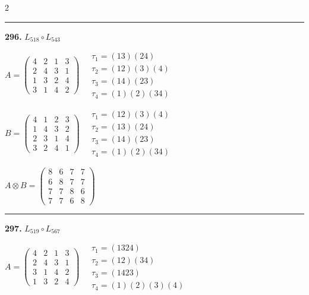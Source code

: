 \begin{multicols}{2}
\vspace{0.3em}
\hrule
\vspace{0.3em}

\noindent\textbf{296.} $L_{518} \circ L_{543}$

$A = \begin{pmatrix} 4 & 2 & 1 & 3 \\ 2 & 4 & 3 & 1 \\ 1 & 3 & 2 & 4 \\ 3 & 1 & 4 & 2 \end{pmatrix} \quad \begin{matrix} \tau_{1}=(1 3)(2 4) \\ \tau_{2}=(1 2)(3)(4) \\ \tau_{3}=(1 4)(2 3) \\ \tau_{4}=(1)(2)(3 4) \end{matrix}$

$B = \begin{pmatrix} 4 & 1 & 2 & 3 \\ 1 & 4 & 3 & 2 \\ 2 & 3 & 1 & 4 \\ 3 & 2 & 4 & 1 \end{pmatrix} \quad \begin{matrix} \tau_{1}=(1 2)(3)(4) \\ \tau_{2}=(1 3)(2 4) \\ \tau_{3}=(1 4)(2 3) \\ \tau_{4}=(1)(2)(3 4) \end{matrix}$

$A \otimes B = \begin{pmatrix} 8 & 6 & 7 & 7 \\ 6 & 8 & 7 & 7 \\ 7 & 7 & 8 & 6 \\ 7 & 7 & 6 & 8 \end{pmatrix}$

\vspace{0.3em}
\hrule
\vspace{0.3em}

\noindent\textbf{297.} $L_{519} \circ L_{567}$

$A = \begin{pmatrix} 4 & 2 & 1 & 3 \\ 2 & 4 & 3 & 1 \\ 3 & 1 & 4 & 2 \\ 1 & 3 & 2 & 4 \end{pmatrix} \quad \begin{matrix} \tau_{1}=(1 3 2 4) \\ \tau_{2}=(1 2)(3 4) \\ \tau_{3}=(1 4 2 3) \\ \tau_{4}=(1)(2)(3)(4) \end{matrix}$


\end{multicols}
